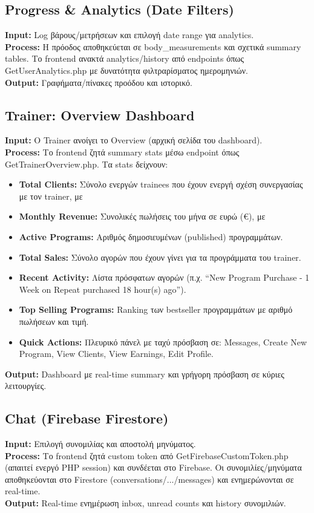 \documentclass[12pt,a4paper]{report}
\begin{document}
\subsection{Progress \& Analytics (Date Filters)}
\textbf{Input:} Log βάρους/μετρήσεων και επιλογή date range για analytics. \\
\textbf{Process:} Η πρόοδος αποθηκεύεται σε \textenglish{body\_measurements} και σχετικά summary tables. Το frontend ανακτά analytics/history από endpoints όπως \textenglish{GetUserAnalytics.php} με δυνατότητα φιλτραρίσματος ημερομηνιών. \\
\textbf{Output:} Γραφήματα/πίνακες προόδου και ιστορικό.

\subsection{Trainer: Overview Dashboard}
\textbf{Input:} Ο Trainer ανοίγει το Overview (αρχική σελίδα του dashboard). \\
\textbf{Process:} Το frontend ζητά summary stats μέσω endpoint όπως \textenglish{GetTrainerOverview.php}. Τα stats δείχνουν:
\begin{itemize}[label=•]
    \item \textbf{Total Clients:} Σύνολο ενεργών trainees που έχουν ενεργή σχέση συνεργασίας με τον trainer, με %
    \item \textbf{Monthly Revenue:} Συνολικές πωλήσεις του μήνα σε ευρώ (€), με %
    \item \textbf{Active Programs:} Αριθμός δημοσιευμένων (published) προγραμμάτων.
    \item \textbf{Total Sales:} Σύνολο αγορών που έχουν γίνει για τα προγράμματα του trainer.
    \item \textbf{Recent Activity:} Λίστα πρόσφατων αγορών (π.χ. ``New Program Purchase - 1 Week on Repeat purchased 18 hour(s) ago'').
    \item \textbf{Top Selling Programs:} Ranking των bestseller προγραμμάτων με αριθμό πωλήσεων και τιμή.
    \item \textbf{Quick Actions:} Πλευρικό πάνελ με ταχύ πρόσβαση σε: Messages, Create New Program, View Clients, View Earnings, Edit Profile.
\end{itemize}  
\textbf{Output:} Dashboard με real-time summary και γρήγορη πρόσβαση σε κύριες λειτουργίες.

\subsection{Chat (Firebase Firestore)}
\textbf{Input:} Επιλογή συνομιλίας και αποστολή μηνύματος. \\
\textbf{Process:} Το frontend ζητά custom token από \textenglish{GetFirebaseCustomToken.php} (απαιτεί ενεργό PHP session) και συνδέεται στο Firebase. Οι συνομιλίες/μηνύματα αποθηκεύονται στο Firestore (\textenglish{conversations/.../messages}) και ενημερώνονται σε real-time. \\
\textbf{Output:} Real-time ενημέρωση inbox, unread counts και history συνομιλιών.
\end{document}
